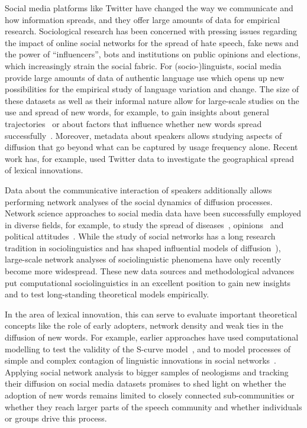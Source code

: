 \documentclass[draft, a4paper, abstract=on]{scrartcl}
\begin{document}
Social media platforms like Twitter have changed the way we communicate and how information spreads, and they offer large amounts of data for empirical research. Sociological research has been concerned with pressing issues regarding the impact of online social networks for the spread of hate speech, fake news and the power of \enquote{influencers}, bots and institutions on public opinions and elections, which increasingly strain the social fabric. For (socio-)linguists, social media provide large amounts of data of authentic language use which opens up new possibilities for the empirical study of language variation and change. The size of these datasets as well as their informal nature allow for large-scale studies on the use and spread of new words, for example, to gain insights about general trajectories~\parencite{Nini2017ApplicationGrowth} or about factors that influence whether new words spread successfully~\parencite{Grieve2018NaturalSelection}. Moreover, metadata about speakers allows studying aspects of diffusion that go beyond what can be captured by usage frequency alone. Recent work has, for example, used Twitter data to investigate the geographical spread of lexical innovations.~\parencite{Eisenstein2014DiffusionLexical,Grieve2017GeographicalPatterns,Grieve2018MappingLexical}

Data about the communicative interaction of speakers additionally allows performing network analyses of the social dynamics of diffusion processes. Network science approaches to social media data have been successfully employed in diverse fields, for example, to study the spread of diseases~\parencite{Lu2018AccurateInfluenza}, opinions~\parencite{West2014ExploitingSocial} and political attitudes~\parencite{PewResearchCenter2019NationalPolitics}. While the study of social networks has a long research tradition in sociolinguistics and has shaped influential models of diffusion~\parencite[e.g.][]{Milroy1985LinguisticChange}), large-scale network analyses of sociolinguistic phenomena have only recently become more widespread. These new data sources and methodological advances put computational sociolinguistics in an excellent position to gain new insights and to test long-standing theoretical models empirically.

In the area of lexical innovation, this can serve to evaluate important theoretical concepts like the role of early adopters, network density and weak ties in the diffusion of new words. For example, earlier approaches have used computational modelling to test the validity of the S-curve model~\parencite{Blythe2012ScurvesMechanisms}, and to model processes of simple and complex contagion of linguistic innovations in social networks~\parencite{Goel2016SocialDynamics}. Applying social network analysis to bigger samples of neologisms and tracking their diffusion on social media datasets promises to shed light on whether the adoption of new words remains limited to closely connected sub-communities or whether they reach larger parts of the speech community and whether individuals or groups drive this process.
\end{document}
